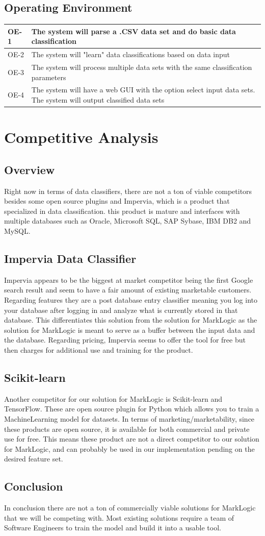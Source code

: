 \documentclass[12pt,oneside,letterpaper]{article}
\begin{document}
\subsection{Operating Environment}
\begin{tabular}{|p{.5in}|p{5in}|}
\hline
OE-1&The system will parse a .CSV data set and do basic data classification\\
\hline
OE-2&The system will "learn" data classifications based on data input\\
\hline
OE-3&The system will process multiple data sets with the same classification parameters\\
\hline
OE-4&The system will have a web GUI with the option select input data sets. The system will output classified data sets\\
\hline
\end{tabular}
\section{Competitive Analysis}
\subsection{Overview}
Right now in terms of data classifiers, there are not a ton of viable competitors besides some open source plugins and Impervia, which is a product that specialized in data classification. this product is mature and interfaces with multiple databases such as Oracle, Microsoft SQL, SAP Sybase, IBM DB2 and MySQL.  \subsection{Impervia Data Classifier}
Impervia appears to be the biggest at market competitor being the first Google search result and seem to have a fair amount of existing marketable customers. Regarding features they are a post database entry classifier meaning you log into your database after logging in and analyze what is currently stored in that database. This differentiates this solution from the solution for MarkLogic as the solution for MarkLogic is meant to serve as a buffer between the input data and the database.  Regarding pricing, Impervia seems to offer the tool for free but then charges for additional use and training for the product. 


\subsection{Scikit-learn}
Another competitor for our solution for MarkLogic is Scikit-learn and TensorFlow. These are open source plugin for Python which allows you to train a MachineLearning model for datasets. In terms of marketing/marketability, since these products are open source, it is available for both commercial and private use for free. This means these product are not a direct competitor to our solution for MarkLogic, and can probably be used in our implementation pending on the desired feature set. 

\subsection{Conclusion}
In conclusion there are not a ton of commercially viable solutions for MarkLogic that we will be competing with. Most existing solutions require a team of Software Engineers to train the model and build it into a usable tool. 
\end{document}
